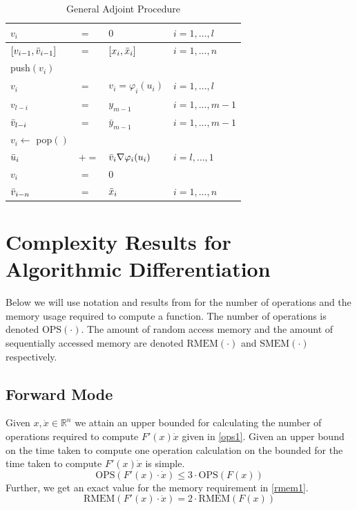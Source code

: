 \documentclass{article}
\begin{document}
\begin{table}[h]
    \centering
    \begin{tabular}{|llll|}
        \hline
        $v_{i}$ & $=$ & $0$ & $i = 1, \ldots, l$ \\
        \hline
        $[v_{i-1}, \Bar{v}_{i-1}]$ & $=$ & $[x_{i}, \Bar{x}_{i}]$ & $i = 1, \ldots, n$ \\
        \hline
        push$(v_i)$ & & & \\
        $v_{i}$ & $=$ & $v_i = \varphi_i (u_i)$ & $i = 1, \ldots, l$ \\
        \hline
        $v_{l-i}$ & $=$ & $y_{m-1}$ & $i = 1, \ldots, m-1$ \\
        $\Bar{v}_{l-i}$ & $=$ & $\bar{y}_{m-1}$ & $i = 1, \ldots, m-1$ \\
        \hline
        $v_i \leftarrow$ pop$()$ & & & \\
        $\Bar{u}_i$ & $+=$ & $\Bar{v}_i \nabla \varphi_i (u_i)$ & $i = l, \ldots, 1$ \\
        $v_i$ & $=$ & $0$ & \\
        \hline
        $\Bar{v}_{i-n}$ & $=$ & $\Bar{x}_i$ & $i = 1, \ldots, n$ \\
        \hline
    \end{tabular}
    \caption{General Adjoint Procedure}
    \label{tab:ap}
\end{table}

\section{Complexity Results for Algorithmic Differentiation}

Below we will use notation and results from \cite{dhamarticle} for the number of operations and the memory usage required to compute a function. The number of operations is denoted $\text{OPS}(\cdot)$. The amount of random access memory and the amount of sequentially accessed memory are denoted $\text{RMEM}(\cdot)$ and $\text{SMEM}(\cdot)$ respectively. 

\subsection{Forward Mode}

Given $x, \Dot{x} \in \mathbb{R}^n$ we attain an upper bounded for calculating the number of operations required to compute $F'(x) \Dot{x}$ given in \eqref{ops1}. Given an upper bound on the time taken to compute one operation calculation on the bounded for the time taken to compute $F'(x) \Dot{x}$ is simple.
\begin{equation} \label{ops1}
    \text{OPS}(F'(x) \cdot \Dot{x}) \leq 3 \cdot \text{OPS}(F(x))
\end{equation}
Further, we get an exact value for the memory requirement in \eqref{rmem1}.
\begin{equation} \label{rmem1}
    \text{RMEM}(F'(x) \cdot \Dot{x}) = 2 \cdot \text{RMEM}(F(x))
\end{equation}
\end{document}
